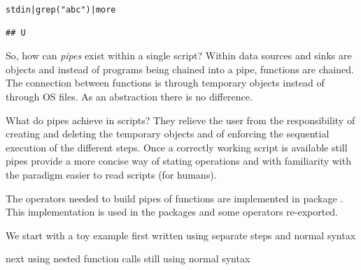 \documentclass[krantz2]{krantz}\usepackage{knitr}%
\begin{document}
\begin{knitrout}\footnotesize
{}\color{fgcolor}\begin{kframe}
\begin{alltt}
stdin | grep("abc") | more
\end{alltt}

\begin{verbatim}
## U
\end{verbatim}
\end{kframe}
\end{knitrout}

So, how can \emph{pipes} exist within a single script? Within \Rlang data sources and sinks are \Rlang objects and instead of programs being chained into a pipe, functions are chained. The connection between functions is through temporary \Rlang objects instead of through OS files. As an abstraction there is no difference.

What do pipes achieve in \Rlang scripts? They relieve the user from the responsibility of creating and deleting the temporary objects and of enforcing the sequential execution of the different steps. Once a correctly working script is available still pipes provide a more concise way of stating operations and with familiarity with the paradigm easier to read scripts (for humans).

The operators needed to build pipes of \Rlang functions are implemented in package . This implementation is used in the  packages and some operators re-exported.

We start with a toy example first written using separate steps and normal \Rlang syntax
\begin{knitrout}\footnotesize
{}\color{fgcolor}\begin{kframe}
\begin{alltt}
 \hlkwb{<-} \hlopt{:}
 \hlkwb{<-} 
 \hlkwb{<-} 
\end{alltt}
\end{kframe}
\end{knitrout}

next using nested function calls still using normal \Rlang syntax

\begin{knitrout}\footnotesize
{}\color{fgcolor}\begin{kframe}
\begin{alltt}
 \hlkwb{<-} \hlstd{(}
\end{alltt}
\end{kframe}
\end{knitrout}
\end{document}
